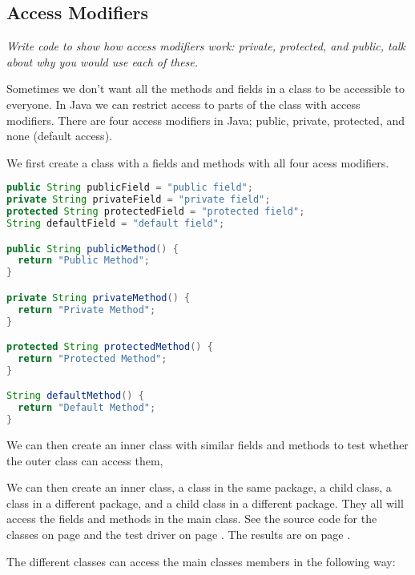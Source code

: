 \subsection{Access Modifiers}
\textit{Write code to show how access modifiers work: private, protected, and public, talk about why you would use each of these.}

Sometimes we don't want all the methods and fields in a class to be accessible to everyone. In Java we can restrict access to parts of the class with access modifiers. There are four access modifiers in Java; public, private, protected, and none (default access).

We first create a class with a fields and methods with all four acess modifiers.
\begin{lstlisting}[language=Java]
public String publicField = "public field";
private String privateField = "private field";
protected String protectedField = "protected field";
String defaultField = "default field";

public String publicMethod() {
  return "Public Method";
}

private String privateMethod() {
  return "Private Method";
}

protected String protectedMethod() {
  return "Protected Method";
}

String defaultMethod() {
  return "Default Method";
}
\end{lstlisting}

We can then create an inner class with similar fields and methods to test whether the outer class can access them,

We can then create an inner class, a class in the same package, a child class, a class in a different package, and a child class in a different package. They all will access the fields and methods in the main class. See the source code for the classes on page \pageref{App:AppendixKClasses} and the test driver on page \pageref{App:AppendixKTest}. The results are on page \pageref{App:AppendixKResults}.

The different classes can access the main classes members in the following way:

